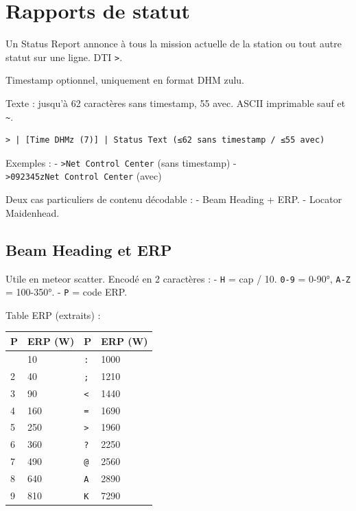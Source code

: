 \chapter[RAPPORTS DE STATUT]{Rapports de statut}\label{rapports-de-statut}

Un Status Report annonce à tous la mission actuelle de la station ou
tout autre statut sur une ligne. DTI \texttt{\textgreater{}}.

Timestamp optionnel, uniquement en format DHM zulu.

Texte : jusqu'à 62 caractères sans timestamp, 55 avec. ASCII imprimable
sauf \texttt{\textbar{}} et \texttt{\textasciitilde{}}.

\begin{verbatim}
> | [Time DHMz (7)] | Status Text (≤62 sans timestamp / ≤55 avec)
\end{verbatim}

Exemples : - \texttt{\textgreater{}Net\ Control\ Center} (sans
timestamp) - \texttt{\textgreater{}092345zNet\ Control\ Center} (avec)

Deux cas particuliers de contenu décodable : - Beam Heading + ERP. -
Locator Maidenhead.

\section{Beam Heading et ERP}\label{beam-heading-et-erp}

Utile en meteor scatter. Encodé en 2 caractères : - \texttt{H} = cap /
10. \texttt{0-9} = 0-90°, \texttt{A-Z} = 100-350°. - \texttt{P} = code
ERP.

Table ERP (extraits) :

\begin{longtable}[]{@{}llll@{}}
\toprule\noalign{}
P & ERP (W) & P & ERP (W) \\
\midrule\noalign{}
\endhead
\bottomrule\noalign{}
\endlastfoot
1 & 10 & \texttt{:} & 1000 \\
2 & 40 & \texttt{;} & 1210 \\
3 & 90 & \texttt{\textless{}} & 1440 \\
4 & 160 & \texttt{=} & 1690 \\
5 & 250 & \texttt{\textgreater{}} & 1960 \\
6 & 360 & \texttt{?} & 2250 \\
7 & 490 & \texttt{@} & 2560 \\
8 & 640 & \texttt{A} & 2890 \\
9 & 810 & \texttt{K} & 7290 \\
\end{longtable}

